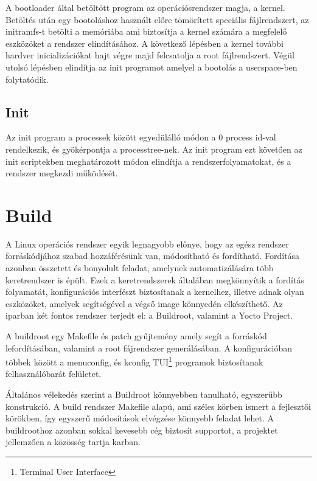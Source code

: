 A bootloader által betöltött program az operációsrendszer magja, a
kernel. Betöltés után egy bootoláshoz használt előre tömörített speciális
fájlrendszert, az initramfs-t betölti a memóriába ami biztosítja a kernel számára
a megfelelő eszközöket a rendszer elindításához. A következő lépésben a kernel
további hardver inicializációkat hajt végre majd felcsatolja a root
fájlrendszert. Végül utolsó lépésben elindítja az init programot amelyel a
bootolás a userspace-ben folytatódik.

\subsection{Init}

Az init program a processek között egyedülálló módon a 0 process id-val
rendelkezik, és gyökérpontja a processtree-nek. Az init program ezt követően az
init scriptekben meghatározott módon elindítja a rendszerfolyamatokat, és a
rendszer megkezdi működését.

\section{Build}

A Linux operációs rendszer egyik legnagyobb előnye, hogy az egész rendszer
forráskódjához szabad hozzáférésünk van, módosítható és fordítható. Fordítása
azonban összetett és bonyolult feladat, amelynek automatizálására több
keretrendszer is épült. Ezek a keretrendszerek általában megkönnyítik a fordítás
folyamatát, konfigurációs interfészt biztosítanak a kernelhez, illetve adnak
olyan eszközöket, amelyek segítségével a végső image könnyedén elkészíthető. Az
iparban két fontos rendszer terjedt el: a Buildroot, valamint a Yocto Project.

\medskip

A buildroot egy Makefile és patch gyűjtemény amely segít a forráskód
lefordításában, valamint a root fájrendszer generálásában. A konfigurációban
többek között a menuconfig, és kconfig TUI\footnote{Terminal User Interface}
programok biztosítanak felhasználóbarát felületet. 

Általános vélekedés szerint a Buildroot könnyebben tanulható, egyszerűbb
konstrukció. A build rendszer Makefile alapú, ami széles körben ismert a
fejlesztői körökben, így egyszerű módosítások elvégzése könnyebb feladat lehet. A
buildroothoz azonban sokkal kevesebb cég biztosít supportot, a projektet
jellemzően a közösség tartja karban.

\medskip

